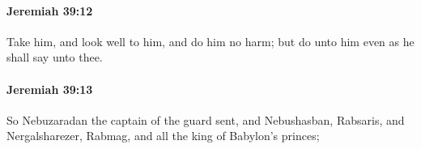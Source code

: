 		\paragraph{Jeremiah 39:12} %
			\label{JEREMIAH-39-12}

			Take him, and look well to him, and do him no harm; but do unto him even as he shall say unto thee.


		\paragraph{Jeremiah 39:13} %
			\label{JEREMIAH-39-13}

			So Nebuzaradan the captain of the guard sent, and Nebushasban, Rabsaris, and Nergalsharezer, Rabmag, and all the king of Babylon’s princes;


